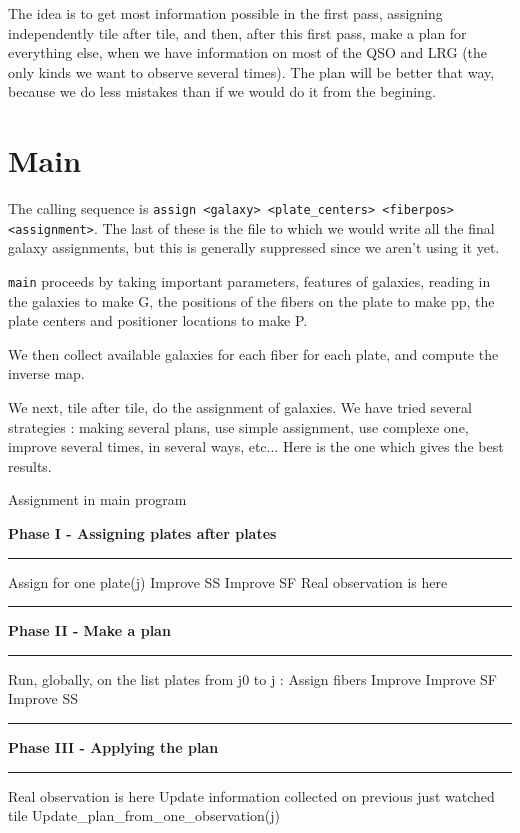 \documentclass{article}
\newcommand\Algphasee[1]{%
\Statex\hspace*{-\algorithmicindent}\textbf{#1}%
\vspace*{-.7\baselineskip}\Statex\hspace*{\dimexpr-\algorithmicindent-2pt\relax}\rule{\textwidth}{0.4pt}%
}
\newcommand\Algphase[1]{%
\vspace*{-.7\baselineskip}\Statex\hspace*{\dimexpr-\algorithmicindent-2pt\relax}\rule{\textwidth}{0.4pt}%
\Statex\hspace*{-\algorithmicindent}\textbf{#1}%
\vspace*{-.7\baselineskip}\Statex\hspace*{\dimexpr-\algorithmicindent-2pt\relax}\rule{\textwidth}{0.4pt}%
}
\begin{document}
The idea is to get most information possible in the first pass, assigning independently tile after tile, and then, after this first pass, make a plan for everything else, when we have information on most of the QSO and LRG (the only kinds we want to observe several times). The plan will be better that way, because we do less mistakes than if we would do it from the begining.


\section{Main}
 The calling sequence is {\tt assign  <galaxy> <plate\_centers> <fiberpos> <assignment>}. The last of these is the file to which we would write all the final galaxy assignments, but this is generally suppressed since we aren't using it yet.
 

 {\tt main} proceeds by taking important parameters, features of galaxies, reading in the galaxies to make G, the positions of the fibers on the plate to make pp, the plate centers and positioner locations to make P. 
 
We then collect available galaxies for each fiber for each plate, and compute the inverse map.
 
We next, tile after tile, do the assignment of galaxies. We have tried several strategies : making several plans, use simple assignment, use complexe one, improve several times, in several ways, etc... Here is the one which gives the best results.


\begin{algorithm}
	\caption{Assignment in main program}\label{euclid}
	\begin{algorithmic}[1]
		\Algphasee{Phase I - Assigning plates after plates}
		\State Assign for one plate(j)
		\State Improve SS
		\State Improve SF
		\State Real observation is here
		\EndFor
	\end{algorithmic}

	\begin{algorithmic}[1]
		\Algphase{Phase II - Make a plan}
		\State Run, globally, on the list plates from j0 to j :
		\State Assign fibers
		\State Improve
		\State Improve SF
		\State Improve SS
	\end{algorithmic}

	\begin{algorithmic}[1]
		\Algphase{Phase III - Applying the plan}
		\State Real observation is here
		\State Update information collected on previous just watched tile
		\State Update\_plan\_from\_one\_observation(j)
		\EndFor
	\end{algorithmic}
\end{algorithm}
\end{document}
